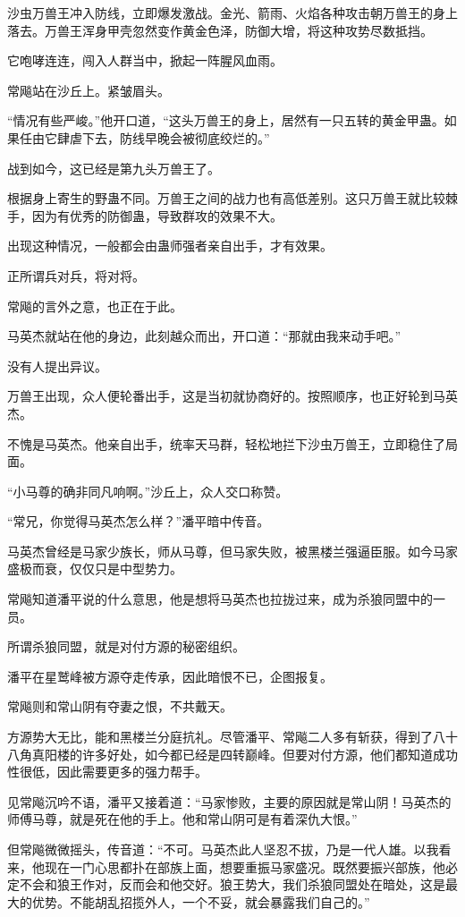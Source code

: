 \begin{this_body}
沙虫万兽王冲入防线，立即爆发激战。金光、箭雨、火焰各种攻击朝万兽王的身上落去。万兽王浑身甲壳忽然变作黄金色泽，防御大增，将这种攻势尽数抵挡。

它咆哮连连，闯入人群当中，掀起一阵腥风血雨。

常飚站在沙丘上。紧皱眉头。

“情况有些严峻。”他开口道，“这头万兽王的身上，居然有一只五转的黄金甲蛊。如果任由它肆虐下去，防线早晚会被彻底绞烂的。”

战到如今，这已经是第九头万兽王了。

根据身上寄生的野蛊不同。万兽王之间的战力也有高低差别。这只万兽王就比较棘手，因为有优秀的防御蛊，导致群攻的效果不大。

出现这种情况，一般都会由蛊师强者亲自出手，才有效果。

正所谓兵对兵，将对将。

常飚的言外之意，也正在于此。

马英杰就站在他的身边，此刻越众而出，开口道：“那就由我来动手吧。”

没有人提出异议。

万兽王出现，众人便轮番出手，这是当初就协商好的。按照顺序，也正好轮到马英杰。

不愧是马英杰。他亲自出手，统率天马群，轻松地拦下沙虫万兽王，立即稳住了局面。

“小马尊的确非同凡响啊。”沙丘上，众人交口称赞。

“常兄，你觉得马英杰怎么样？”潘平暗中传音。

马英杰曾经是马家少族长，师从马尊，但马家失败，被黑楼兰强逼臣服。如今马家盛极而衰，仅仅只是中型势力。

常飚知道潘平说的什么意思，他是想将马英杰也拉拢过来，成为杀狼同盟中的一员。

所谓杀狼同盟，就是对付方源的秘密组织。

潘平在星鹫峰被方源夺走传承，因此暗恨不已，企图报复。

常飚则和常山阴有夺妻之恨，不共戴天。

方源势大无比，能和黑楼兰分庭抗礼。尽管潘平、常飚二人多有斩获，得到了八十八角真阳楼的许多好处，如今都已经是四转巅峰。但要对付方源，他们都知道成功性很低，因此需要更多的强力帮手。

见常飚沉吟不语，潘平又接着道：“马家惨败，主要的原因就是常山阴！马英杰的师傅马尊，就是死在他的手上。他和常山阴可是有着深仇大恨。”

但常飚微微摇头，传音道：“不可。马英杰此人坚忍不拔，乃是一代人雄。以我看来，他现在一门心思都扑在部族上面，想要重振马家盛况。既然要振兴部族，他必定不会和狼王作对，反而会和他交好。狼王势大，我们杀狼同盟处在暗处，这是最大的优势。不能胡乱招揽外人，一个不妥，就会暴露我们自己的。”


\end{this_body}
